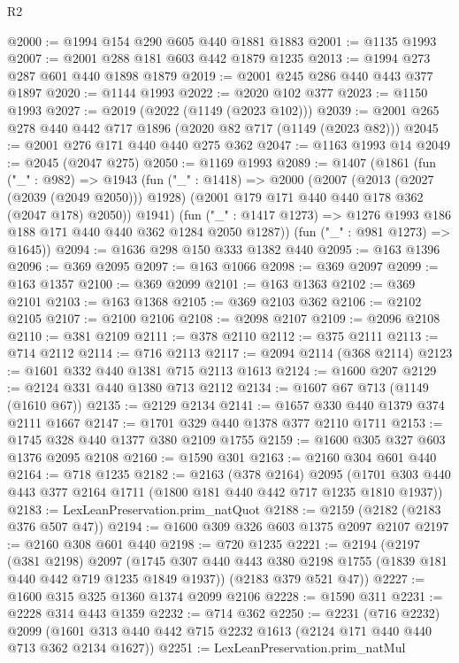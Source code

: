 \begin{lexlean}{R2}
\begin{coremodule}
@2000 := @1994 @154 @290 @605 @440 @1881 @1883
@2001 := @1135 @1993
@2007 := @2001 @288 @181 @603 @442 @1879 @1235
@2013 := @1994 @273 @287 @601 @440 @1898 @1879
@2019 := @2001 @245 @286 @440 @443 @377 @1897
@2020 := @1144 @1993
@2022 := @2020 @102 @377
@2023 := @1150 @1993
@2027 := @2019 (@2022 (@1149 (@2023 @102)))
@2039 := @2001 @265 @278 @440 @442 @717 @1896 (@2020 @82 @717 (@1149 (@2023 @82)))
@2045 := @2001 @276 @171 @440 @440 @275 @362
@2047 := @1163 @1993 @14
@2049 := @2045 (@2047 @275)
@2050 := @1169 @1993
@2089 := @1407
    (@1861
      (fun ("_" : @982) =>
      @1943
        (fun ("_" : @1418) =>
        @2000
          (@2007
            (@2013 (@2027 (@2039 (@2049 @2050))) @1928)
            (@2001 @179 @171 @440 @440 @178 @362 (@2047 @178) @2050))
          @1941)
        (fun ("_" : @1417 @1273) => @1276 @1993 @186 @188 @171 @440 @440 @362 @1284 @2050 @1287))
      (fun ("_" : @981 @1273) => @1645))
@2094 := @1636 @298 @150 @333 @1382 @440
@2095 := @163 @1396
@2096 := @369 @2095
@2097 := @163 @1066
@2098 := @369 @2097
@2099 := @163 @1357
@2100 := @369 @2099
@2101 := @163 @1363
@2102 := @369 @2101
@2103 := @163 @1368
@2105 := @369 @2103 @362
@2106 := @2102 @2105
@2107 := @2100 @2106
@2108 := @2098 @2107
@2109 := @2096 @2108
@2110 := @381 @2109
@2111 := @378 @2110
@2112 := @375 @2111
@2113 := @714 @2112
@2114 := @716 @2113
@2117 := @2094 @2114 (@368 @2114)
@2123 := @1601 @332 @440 @1381 @715 @2113 @1613
@2124 := @1600 @207
@2129 := @2124 @331 @440 @1380 @713 @2112
@2134 := @1607 @67 @713 (@1149 (@1610 @67))
@2135 := @2129 @2134
@2141 := @1657 @330 @440 @1379 @374 @2111 @1667
@2147 := @1701 @329 @440 @1378 @377 @2110 @1711
@2153 := @1745 @328 @440 @1377 @380 @2109 @1755
@2159 := @1600 @305 @327 @603 @1376 @2095 @2108
@2160 := @1590 @301
@2163 := @2160 @304 @601 @440
@2164 := @718 @1235
@2182 := @2163
    (@378 @2164)
    @2095
    (@1701 @303 @440 @443 @377 @2164 @1711 (@1800 @181 @440 @442 @717 @1235 @1810 @1937))
@2183 := LexLeanPreservation.prim_natQuot
@2188 := @2159 (@2182 (@2183 @376 @507 @47))
@2194 := @1600 @309 @326 @603 @1375 @2097 @2107
@2197 := @2160 @308 @601 @440
@2198 := @720 @1235
@2221 := @2194
    (@2197
      (@381 @2198)
      @2097
      (@1745 @307 @440 @443 @380 @2198 @1755 (@1839 @181 @440 @442 @719 @1235 @1849 @1937))
      (@2183 @379 @521 @47))
@2227 := @1600 @315 @325 @1360 @1374 @2099 @2106
@2228 := @1590 @311
@2231 := @2228 @314 @443 @1359
@2232 := @714 @362
@2250 := @2231
    (@716 @2232)
    @2099
    (@1601 @313 @440 @442 @715 @2232 @1613 (@2124 @171 @440 @440 @713 @362 @2134 @1627))
@2251 := LexLeanPreservation.prim_natMul

\end{coremodule}
\end{lexlean}
